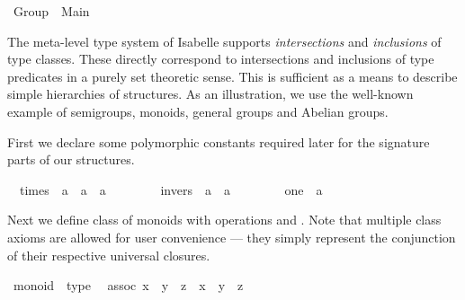 %
\begin{isabellebody}%
\def\isabellecontext{Group}%
%
\isamarkuptrue%
\ Group\ {\isacharequal}\ Main{\isacharcolon}\isamarkupfalse%
%
\begin{isamarkuptext}%
\medskip\noindent The meta-level type system of Isabelle supports
  \emph{intersections} and \emph{inclusions} of type classes. These
  directly correspond to intersections and inclusions of type
  predicates in a purely set theoretic sense. This is sufficient as a
  means to describe simple hierarchies of structures.  As an
  illustration, we use the well-known example of semigroups, monoids,
  general groups and Abelian groups.%
\end{isamarkuptext}%
\isamarkuptrue%
%
\isamarkuptrue%
%
\begin{isamarkuptext}%
First we declare some polymorphic constants required later for the
  signature parts of our structures.%
\end{isamarkuptext}%
\isamarkuptrue%
\isanewline
\ \ times\ {\isacharcolon}{\isacharcolon}\ {\isachardoublequote}{\isacharprime}a\ {\isasymRightarrow}\ {\isacharprime}a\ {\isasymRightarrow}\ {\isacharprime}a{\isachardoublequote}\ \ \ \ {\isacharparenleft}\ {\isachardoublequote}{\isasymodot}{\isachardoublequote}\ {}{}{\isacharparenright}\isanewline
\ \ invers\ {\isacharcolon}{\isacharcolon}\ {\isachardoublequote}{\isacharprime}a\ {\isasymRightarrow}\ {\isacharprime}a{\isachardoublequote}\ \ \ \ {\isacharparenleft}{\isachardoublequote}{\isacharparenleft}{\isacharunderscore}{\isasyminv}{\isacharparenright}{\isachardoublequote}\ {\isacharbrackleft}{}{}{}{}{\isacharbrackright}\ {}{}{}{\isacharparenright}\isanewline
\ \ one\ {\isacharcolon}{\isacharcolon}\ {\isacharprime}a\ \ \ \ {\isacharparenleft}{\isachardoublequote}{\isasymunit}{\isachardoublequote}{\isacharparenright}\isamarkupfalse%
%
\begin{isamarkuptext}%
\noindent Next we define class  of monoids with
  operations \isa{{\isasymodot}} and \isa{{\isasymunit}}.  Note that multiple class
  axioms are allowed for user convenience --- they simply represent
  the conjunction of their respective universal closures.%
\end{isamarkuptext}%
\isamarkuptrue%
\ monoid\ {\isasymsubseteq}\ type\isanewline
\ \ assoc{\isacharcolon}\ {\isachardoublequote}{\isacharparenleft}x\ {\isasymodot}\ y{\isacharparenright}\ {\isasymodot}\ z\ {\isacharequal}\ x\ {\isasymodot}\ {\isacharparenleft}y\ {\isasymodot}\ z{\isacharparenright}{\isachardoublequote}\isanewline

\end{isabellebody}
